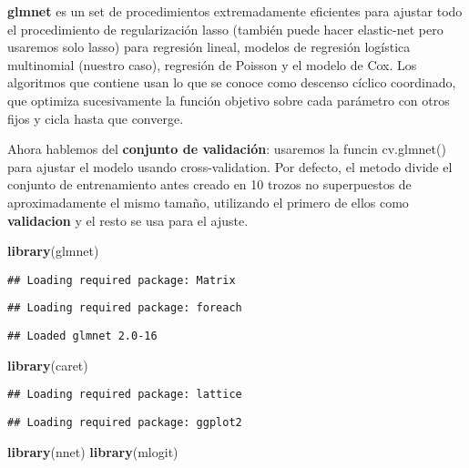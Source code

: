 \documentclass[]{article}
\newenvironment{Shaded}{\begin{snugshade}}{\end{snugshade}}
\newcommand{\KeywordTok}[1]{\textcolor[rgb]{0.13,0.29,0.53}{\textbf{#1}}}
\newcommand{\NormalTok}[1]{#1}
\begin{document}
\textbf{glmnet} es un set de procedimientos extremadamente eficientes
para ajustar todo el procedimiento de regularización lasso (también
puede hacer elastic-net pero usaremos solo lasso) para regresión lineal,
modelos de regresión logística multinomial (nuestro caso), regresión de
Poisson y el modelo de Cox. Los algoritmos que contiene usan lo que se
conoce como descenso cíclico coordinado, que optimiza sucesivamente la
función objetivo sobre cada parámetro con otros fijos y cicla hasta que
converge.

Ahora hablemos del \textbf{conjunto de validación}: usaremos la funcin
cv.glmnet() para ajustar el modelo usando cross-validation. Por defecto,
el metodo divide el conjunto de entrenamiento antes creado en 10 trozos
no superpuestos de aproximadamente el mismo tamaño, utilizando el
primero de ellos como \textbf{validacion} y el resto se usa para el
ajuste.

\begin{Shaded}
\begin{Highlighting}[]
\KeywordTok{library}\NormalTok{(glmnet)}
\end{Highlighting}
\end{Shaded}

\begin{verbatim}
## Loading required package: Matrix
\end{verbatim}

\begin{verbatim}
## Loading required package: foreach
\end{verbatim}

\begin{verbatim}
## Loaded glmnet 2.0-16
\end{verbatim}

\begin{Shaded}
\begin{Highlighting}[]
\KeywordTok{library}\NormalTok{(caret)}
\end{Highlighting}
\end{Shaded}

\begin{verbatim}
## Loading required package: lattice
\end{verbatim}

\begin{verbatim}
## Loading required package: ggplot2
\end{verbatim}

\begin{Shaded}
\begin{Highlighting}[]
\KeywordTok{library}\NormalTok{(nnet)}
\KeywordTok{library}\NormalTok{(mlogit)}
\end{Highlighting}
\end{Shaded}
\end{document}
